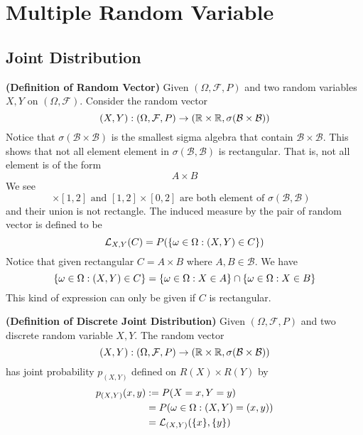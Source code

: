 \documentclass{report}
\begin{document}
\chapter{Multiple Random Variable}
\section{Joint Distribution}
\begin{definition}
\label{4.1.1}
\textbf{(Definition of Random Vector)} Given $(\Omega,\mathcal{F},P)$ and two random variables $X,Y$ on $(\Omega,\mathcal{F})$. Consider the random vector
\begin{equation*}
  (X,Y):(\Omega,\mathcal{F},P)\rightarrow (\mathbb{R} \times \mathbb{R},\sigma(\mathcal{B}\times \mathcal{B}))
\end{equation*}
Notice that $\sigma (\mathcal{B}\times \mathcal{B})$ is the smallest sigma algebra that contain $\mathcal{B}\times \mathcal{B}$. This shows that not all element element in $\sigma (\mathcal{B},\mathcal{B})$ is rectangular. That is, not all element is of the form 
\begin{equation*}
A\times B
\end{equation*}
We see 
\begin{equation*}
[0,2]\times [1,2]\text{ and }[1,2]\times [0,2]\text{ are both element of $\sigma(\mathcal{B},\mathcal{B})$ }
\end{equation*}
and their union is not rectangle. The induced measure by the pair of random vector is defined to be
\begin{equation*}
\mathcal{L}_{X,Y}(C)=P(\{ \omega\in \Omega:(X,Y)\in C \})
\end{equation*}
Notice that given rectangular $C=A\times B$ where $A,B \in \mathcal{B}$. We have
\begin{equation*}
\{ \omega \in \Omega :(X,Y)\in C \}=\{ \omega\in \Omega :X \in A \}\cap \{ \omega\in \Omega :X\in B \}
\end{equation*}
This kind of expression can only be given if $C$ is rectangular.
\end{definition}
\begin{definition}
\label{4.1.2}
\textbf{(Definition of Discrete Joint Distribution)} Given $(\Omega,\mathcal{F},P)$ and two discrete random variable $X,Y$. The random vector 
 \begin{equation*}
   (X,Y):(\Omega,\mathcal{F},P)\rightarrow (\mathbb{R}\times \mathbb{R}, \sigma (\mathcal{B}\times \mathcal{B}))
\end{equation*}
has joint probability $p_{(X,Y)}$ defined on $R(X)\times R(Y)$ by
\begin{align*}
  p_{(X,Y)}(x,y)&:=P(X=x,Y=y)\\
  &=P(\omega \in \Omega: (X,Y)=(x,y))\\
  &=\mathcal{L}_{(X,Y)}(\{ x \},\{ y \})
\end{align*}
\end{definition}
\end{document}

